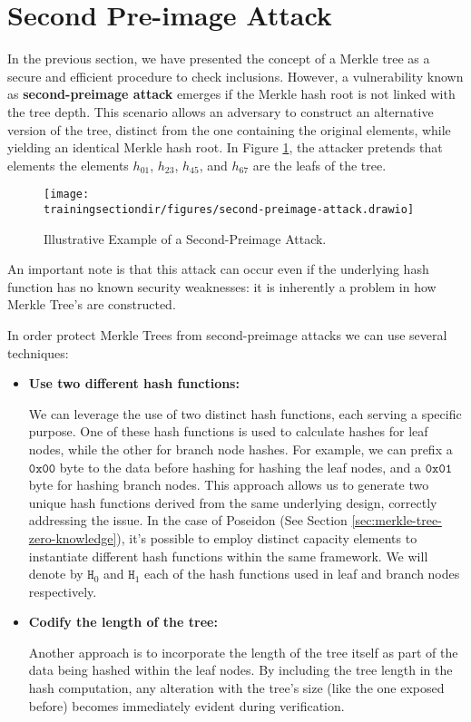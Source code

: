 \section{Second Pre-image Attack}

In the previous section, we have presented the concept of a Merkle tree as a secure and efficient procedure to check inclusions. However, a vulnerability known as \textbf{second-preimage attack} emerges if the Merkle hash root is not linked with the tree depth. This scenario allows an adversary to construct an alternative version of the tree, distinct from the one containing the original elements, while yielding an identical Merkle hash root. In Figure \ref{fig:second-preimage-attack-example}, the attacker pretends that elements the elements $h_{01}$, $h_{23}$, $h_{45}$, and $h_{67}$ are the leafs of the tree.

\begin{figure}[H]
\centering
\texttt{[image: \\trainingsectiondir/figures/second-preimage-attack.drawio]}
\caption{Illustrative Example of a Second-Preimage Attack.}
\label{fig:second-preimage-attack-example}
\end{figure}

An important note is that this attack can occur even if the underlying hash function has no known security weaknesses: it is inherently a problem in how Merkle Tree's are constructed.

In order protect Merkle Trees from second-preimage attacks we can use several techniques:

\begin{itemize}

\item \textbf{Use two different hash functions:}

We can leverage the use of two distinct hash functions, each serving a specific purpose. One of these hash functions is used to calculate hashes for leaf nodes, while the other for branch node hashes. For example, we can prefix a $\texttt{0x00}$ byte to the data before hashing for hashing the leaf nodes, and a $\texttt{0x01}$ byte for hashing branch nodes. This approach allows us to generate two unique hash functions derived from the same underlying design, correctly addressing the issue. In the case of Poseidon (See Section \ref{sec:merkle-tree-zero-knowledge}), it's possible to employ distinct capacity elements to instantiate different hash functions within the same framework. We will denote by $\texttt{H}_0$ and $\texttt{H}_1$ each of the hash functions used in leaf and branch nodes respectively.

\item \textbf{Codify the length of the tree:}

Another approach is to incorporate the length of the tree itself as part of the data being hashed within the leaf nodes. By including the tree length in the hash computation, any alteration with the tree's size (like the one exposed before) becomes immediately evident during verification.

\end{itemize}




